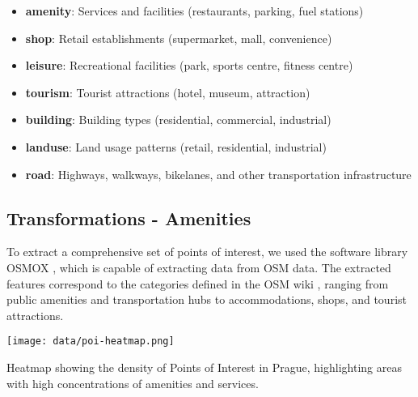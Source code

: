 \begin{itemize}
    \item \textbf{amenity}: Services and facilities (restaurants, parking, fuel stations)
    \item \textbf{shop}: Retail establishments (supermarket, mall, convenience)
    \item \textbf{leisure}: Recreational facilities (park, sports centre, fitness centre)
    \item \textbf{tourism}: Tourist attractions (hotel, museum, attraction)
    \item \textbf{building}: Building types (residential, commercial, industrial)
    \item \textbf{landuse}: Land usage patterns (retail, residential, industrial)
    \item \textbf{road}: Highways, walkways, bikelanes, and other transportation infrastructure
\end{itemize}



\subsection{Transformations - Amenities}

To extract a comprehensive set of points of interest, we used the software library OSMOX , which is capable of extracting data from \acrshort{OSM} data. The extracted features correspond to the categories defined in the OSM wiki , ranging from public amenities and transportation hubs to accommodations, shops, and tourist attractions.

\begin{marginfigure}
    \texttt{[image: data/poi-heatmap.png]}
    \caption{Heatmap showing the density of Points of Interest in Prague, highlighting areas with high concentrations of amenities and services.}
\end{marginfigure}




